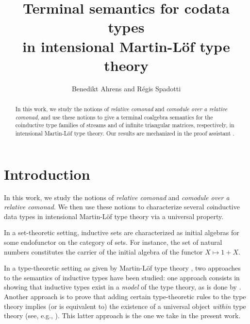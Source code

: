 \documentclass[envcountsame]{llncs}
\begin{document}
\title{Terminal semantics for codata types\\in intensional Martin-L\"of type theory}

\author{Benedikt Ahrens and R\'egis Spadotti}


\newcommand{\fat}[1]{\textbf{#1}}





\maketitle


\begin{abstract}


 In this work, we study the notions of \emph{relative comonad} and \emph{comodule over a relative comonad}, and  
 use these notions to give a terminal coalgebra semantics for the coinductive type families of streams and
 of infinite triangular matrices, respectively, in intensional Martin-L\"of type theory.
 Our results are mechanized in the proof assistant \coq.
   
  
  \end{abstract}




\section{Introduction}
 
 In this work, we study the notions of \emph{relative comonad} and \emph{comodule over a relative comonad}.
 We then use these notions to characterize several \emph{co}inductive data types in intensional Martin-L\"of type theory
 via a universal property.
 
 In a set-theoretic setting, inductive sets are characterized as initial algebras for 
 some endofunctor on the category of sets. For instance, the set of natural numbers constitutes the carrier of the 
 initial algebra of the functor $X \mapsto 1 + X$.
 
 In a type-theoretic setting as given by Martin-L\"of type theory \parencite{martin_lof}, 
 two approaches to the semantics of inductive types have been studied: 
 one approach consists in showing that inductive types exist in a \emph{model} of the type theory,
 as is done by \textcite{DBLP:journals/apal/MoerdijkP00}.
 Another approach is to prove that adding certain type-theoretic rules to the type theory
 implies (or is equivalent to) the existence of a universal object \emph{within} type theory
 (see, e.g., \parencite{DBLP:conf/lics/AwodeyGS12, DBLP:journals/tcs/Dybjer97}).
 This latter approach is the one we take in the present work.
 
\end{document}
